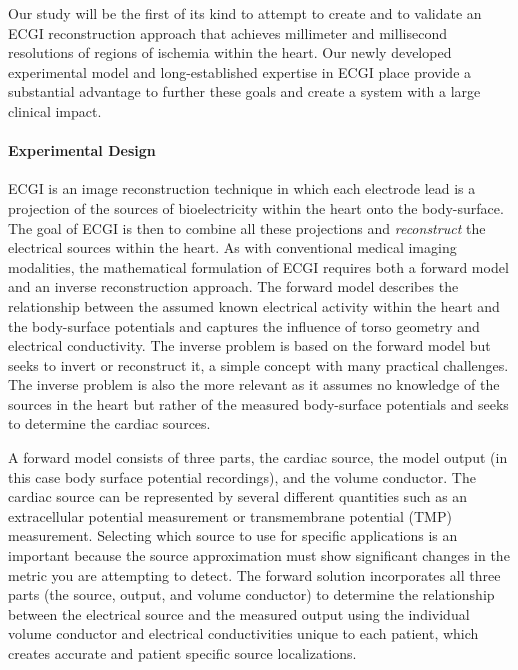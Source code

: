 Our study will be the first of its kind to attempt to create and to
validate an ECGI reconstruction approach that achieves millimeter and
millisecond resolutions of regions of ischemia within the heart. Our newly
developed experimental model and long-established expertise in ECGI place
provide a substantial advantage to further these goals and create a system
with a large clinical impact.


\paragraph{Experimental Design} ECGI is an image reconstruction technique in
which each electrode lead is a projection of the sources of bioelectricity
within the heart onto the body-surface.\cite{RSM:Mes86,RSM:Pul2010} The
goal of ECGI is then to combine all these projections and
\emph{reconstruct} the electrical sources within the heart. As with
conventional medical imaging modalities, the mathematical formulation of
ECGI requires both a forward model and an inverse reconstruction
approach. The forward model describes the relationship between the assumed
known electrical activity within the heart and the body-surface potentials
and captures the influence of torso geometry and electrical
conductivity.\cite{RSM:Mac2010b} The inverse problem is based on the
forward model but seeks to invert or reconstruct it, a simple concept with
many practical challenges.  The inverse problem is also the more relevant
as it assumes no knowledge of the sources in the heart but rather of the
measured body-surface potentials and seeks to determine the cardiac
sources.\cite{RSM:Mes86,RSM:Pul2010}

A forward model consists of three parts, the cardiac source, the model
output (in this case body surface potential recordings), and the volume
conductor. The cardiac source can be represented by several different
quantities such as an extracellular potential measurement or transmembrane
potential (TMP) measurement. Selecting which source to use for specific
applications is an important because the source approximation must show
significant changes in the metric you are attempting to detect. The forward
solution incorporates all three parts (the source, output, and volume
conductor) to determine the relationship between the electrical source and
the measured output using the individual volume conductor and electrical
conductivities unique to each patient, which creates accurate and patient
specific source localizations.

